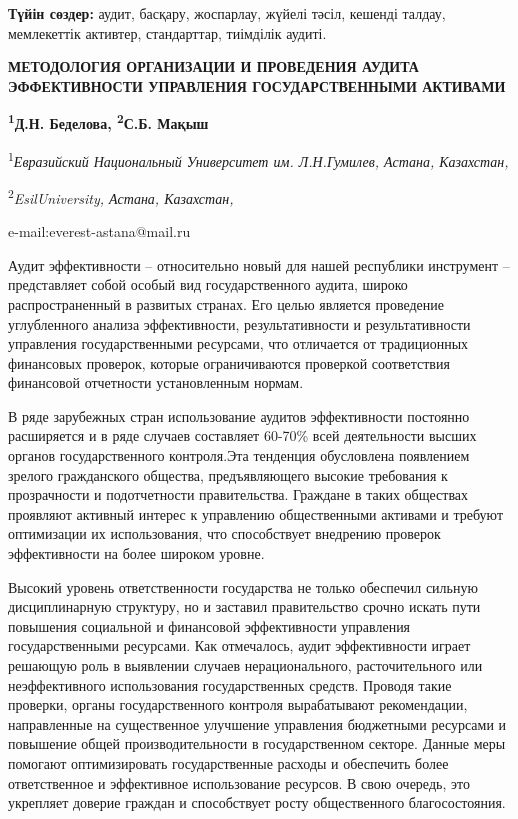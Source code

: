{\bfseries Түйін сөздер:} аудит, басқару, жоспарлау, жүйелі тәсіл, кешенді
талдау, мемлекеттік активтер, стандарттар, тиімділік аудиті.

\begin{articleheader}
{\bfseries МЕТОДОЛОГИЯ ОРГАНИЗАЦИИ И ПРОВЕДЕНИЯ АУДИТА ЭФФЕКТИВНОСТИ УПРАВЛЕНИЯ ГОСУДАРСТВЕННЫМИ АКТИВАМИ}

{\bfseries
\textsuperscript{1}Д.Н. Беделова\textsuperscript{\envelope },
\textsuperscript{2}С.Б. Мақыш}
\end{articleheader}

\begin{affiliation}
\textsuperscript{1}\emph{Евразийский Национальный Университет им. Л.Н.Гумилев, Астана, Казахстан,}

\textsuperscript{2}\emph{EsilUniversity, Астана, Казахстан,}

e-mail:everest-astana@mail.ru
\end{affiliation}

Аудит эффективности -- относительно новый для нашей республики
инструмент -- представляет собой особый вид государственного аудита,
широко распространенный в развитых странах. Его целью является
проведение углубленного анализа эффективности, результативности и
результативности управления государственными ресурсами, что отличается
от традиционных финансовых проверок, которые ограничиваются проверкой
соответствия финансовой отчетности установленным нормам.

В ряде зарубежных стран использование аудитов эффективности постоянно
расширяется и в ряде случаев составляет 60-70\% всей деятельности высших
органов государственного контроля.Эта тенденция обусловлена появлением
зрелого гражданского общества, предъявляющего высокие требования к
прозрачности и подотчетности правительства. Граждане в таких обществах
проявляют активный интерес к управлению общественными активами и требуют
оптимизации их использования, что способствует внедрению проверок
эффективности на более широком уровне.

Высокий уровень ответственности государства не только обеспечил сильную
дисциплинарную структуру, но и заставил правительство срочно искать пути
повышения социальной и финансовой эффективности управления
государственными ресурсами. Как отмечалось, аудит эффективности играет
решающую роль в выявлении случаев нерационального, расточительного или
неэффективного использования государственных средств. Проводя такие
проверки, органы государственного контроля вырабатывают рекомендации,
направленные на существенное улучшение управления бюджетными ресурсами и
повышение общей производительности в государственном секторе. Данные
меры помогают оптимизировать государственные расходы и обеспечить более
ответственное и эффективное использование ресурсов. В свою очередь, это
укрепляет доверие граждан и способствует росту общественного
благосостояния.

